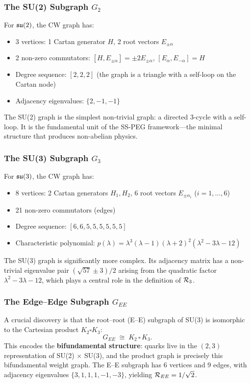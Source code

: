 \subsubsection{The SU(2) Subgraph $G_2$}

For $\mathfrak{su}(2)$, the CW graph has:
\begin{itemize}
\item 3 vertices: 1 Cartan generator $H$, 2 root vectors $E_{\pm\alpha}$
\item 2 non-zero commutators: $[H, E_{\pm\alpha}] = \pm 2 E_{\pm\alpha}$, $[E_\alpha, E_{-\alpha}] = H$
\item Degree sequence: $[2, 2, 2]$ (the graph is a triangle with a self-loop on the Cartan node)
\item Adjacency eigenvalues: $\{2, -1, -1\}$
\end{itemize}

The SU(2) graph is the simplest non-trivial graph: a directed 3-cycle with a self-loop. It is the fundamental unit of the SS-PEG framework---the minimal structure that produces non-abelian physics.

\subsubsection{The SU(3) Subgraph $G_3$}

For $\mathfrak{su}(3)$, the CW graph has:
\begin{itemize}
\item 8 vertices: 2 Cartan generators $H_1, H_2$, 6 root vectors $E_{\pm\alpha_i}$ ($i = 1, \ldots, 6$)
\item 21 non-zero commutators (edges)
\item Degree sequence: $[6, 6, 5, 5, 5, 5, 5, 5]$
\item Characteristic polynomial: $p(\lambda) = \lambda^3(\lambda - 1)(\lambda + 2)^2(\lambda^2 - 3\lambda - 12)$
\end{itemize}

The SU(3) graph is significantly more complex. Its adjacency matrix has a non-trivial eigenvalue pair $(\sqrt{57} \pm 3)/2$ arising from the quadratic factor $\lambda^2 - 3\lambda - 12$, which plays a central role in the definition of $\mathcal{R}_3$.

\subsubsection{The Edge--Edge Subgraph $G_{EE}$}

A crucial discovery is that the root--root (E--E) subgraph of SU(3) is isomorphic to the Cartesian product $K_2 \square K_3$:
\begin{equation}
G_{EE} \;\cong\; K_2 \,\square\, K_3.
\end{equation}
This encodes the \textbf{bifundamental structure}: quarks live in the $(2, 3)$ representation of SU(2) $\times$ SU(3), and the product graph is precisely this bifundamental weight graph. The E--E subgraph has 6 vertices and 9 edges, with adjacency eigenvalues $\{3, 1, 1, 1, -1, -3\}$, yielding $\mathcal{R}_{EE} = 1/\sqrt{2}$.


